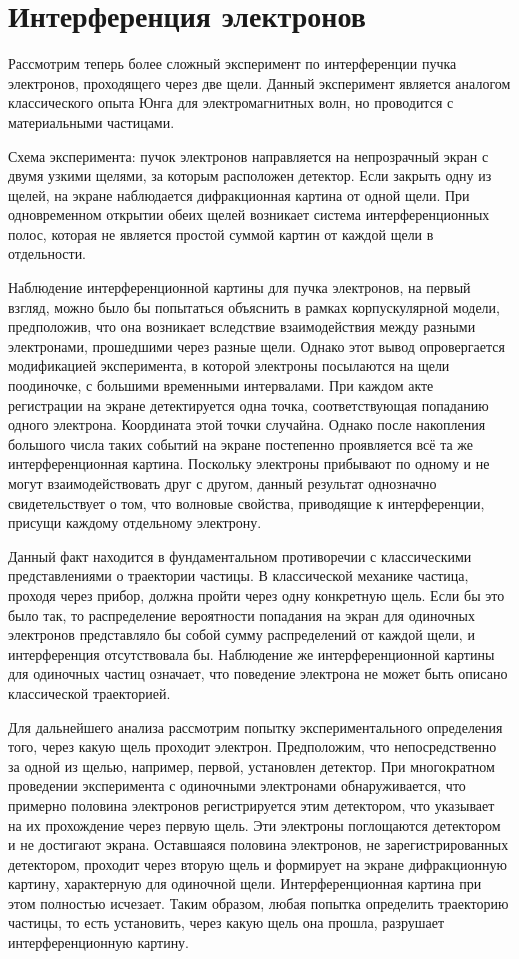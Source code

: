 \documentclass[a4paper, 12pt]{article}
\begin{document}
\section{Интерференция электронов}
Рассмотрим теперь более сложный эксперимент по интерференции пучка электронов,
проходящего через две щели. Данный эксперимент является аналогом классического
опыта Юнга для электромагнитных волн, но проводится с материальными частицами.

Схема эксперимента: пучок электронов направляется на непрозрачный экран с двумя
узкими щелями, за которым расположен детектор. Если закрыть одну из щелей, на
экране наблюдается дифракционная картина от одной щели. При одновременном
открытии обеих щелей возникает система интерференционных полос, которая не
является простой суммой картин от каждой щели в отдельности.

Наблюдение интерференционной картины для пучка электронов, на первый взгляд,
можно было бы попытаться объяснить в рамках корпускулярной модели, предположив,
что она возникает вследствие взаимодействия между разными электронами,
прошедшими через разные щели. Однако этот вывод опровергается модификацией
эксперимента, в которой электроны посылаются на щели поодиночке, с большими
временными интервалами. При каждом акте регистрации на экране детектируется одна
точка, соответствующая попаданию одного электрона. Координата этой точки
случайна. Однако после накопления большого числа таких событий на экране
постепенно проявляется всё та же интерференционная картина. Поскольку электроны
прибывают по одному и не могут взаимодействовать друг с другом, данный результат
однозначно свидетельствует о том, что волновые свойства, приводящие к
интерференции, присущи каждому отдельному электрону.

Данный факт находится в фундаментальном противоречии с классическими
представлениями о траектории частицы. В классической механике частица, проходя
через прибор, должна пройти через одну конкретную щель. Если бы это было так, то
распределение вероятности попадания на экран для одиночных электронов
представляло бы собой сумму распределений от каждой щели, и интерференция
отсутствовала бы. Наблюдение же интерференционной картины для одиночных частиц
означает, что поведение электрона не может быть описано классической
траекторией.

Для дальнейшего анализа рассмотрим попытку экспериментального определения того,
через какую щель проходит электрон. Предположим, что непосредственно за одной из
щелью, например, первой, установлен детектор. При многократном проведении эксперимента с
одиночными электронами обнаруживается, что примерно половина электронов
регистрируется этим детектором, что указывает на их прохождение через первую
щель. Эти электроны поглощаются детектором и не достигают экрана. Оставшаяся
половина электронов, не зарегистрированных детектором, проходит через вторую
щель и формирует на экране дифракционную картину, характерную для одиночной
щели. Интерференционная картина при этом полностью исчезает. Таким образом,
любая попытка определить траекторию частицы, то есть установить, через какую
щель она прошла, разрушает интерференционную картину.
\end{document}

